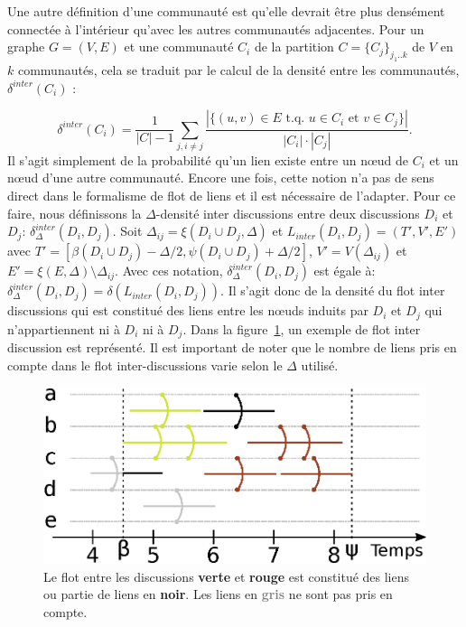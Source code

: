 Une autre définition d'une communauté est qu'elle devrait être plus densément connectée à l'intérieur qu'avec les autres communautés adjacentes.
Pour un graphe $G=(V,E)$ et une communauté $C_i$ de la partition $C = \{C_j\}_{j_1..k}$ de $V$ en $k$ communautés, cela se traduit par le calcul de la densité entre les communautés, $\delta^{inter}(C_i)$ :

\begin{equation}
	\delta^{inter}(C_i) = \frac{1}{|C|-1}\sum_{j, i\ne j}\frac{|\{(u,v)\in E\mbox{ t.q. }u\in C_i\mbox{ et }v\in C_j\}|}{|C_i|\cdot |C_j|}.
\end{equation}
Il s'agit simplement de la probabilité qu'un lien existe entre un n\oe{}ud de $C_i$ et un n\oe{}ud d'une autre communauté.
Encore une fois, cette notion n'a pas de sens direct dans le formalisme de flot de liens et il est nécessaire de l'adapter.
Pour ce faire, nous définissons la $\Delta$-densité inter discussions entre deux discussions $D_i$ et $D_j$: $\delta^{inter}_{\Delta}(D_i,D_j)$.
Soit $\Delta_{ij}=\xi(D_i \cup D_j,\Delta)$ et $L_{inter}(D_i, D_j) = (T',V',E')$ avec  $T'=[\beta(D_i \cup D_j) - \Delta/2,\psi(D_i \cup D_j) + \Delta/2]$, $V'= V(\Delta_{ij})$ et $E' = \xi(E,\Delta) \setminus \Delta_{ij}$.
Avec ces notation, $\delta^{inter}_{\Delta}(D_i,D_j)$ est égale à: $\delta^{inter}_{\Delta}(D_i,D_j) = \delta(L_{inter}(D_i, D_j))$.
Il s'agit donc de la densité du flot inter discussions qui est constitué des liens entre les n\oe{}uds induits par $D_i$ et $D_j$ qui n'appartiennent ni à $D_i$ ni à $D_j$.
Dans la figure~\ref{fig:inter_dens_discussion_ex}, un exemple de flot inter discussion est représenté.
Il est important de noter que le nombre de liens pris en compte dans le flot inter-discussions varie selon le $\Delta$ utilisé.

\begin{figure}
\centering
	\includegraphics[width=0.65\linewidth]{img/mailing/inter_flot.eps}
\caption{Le flot entre les discussions \textcolor{olivegreen}{\textbf{verte}} et  \textcolor{briquered}{\textbf{rouge}} est constitué des liens ou partie de liens en \textbf{noir}. Les liens en \textcolor{gray}{\textbf{gris}} ne sont pas pris en compte.}
\label{fig:inter_dens_discussion_ex}
\end{figure}



